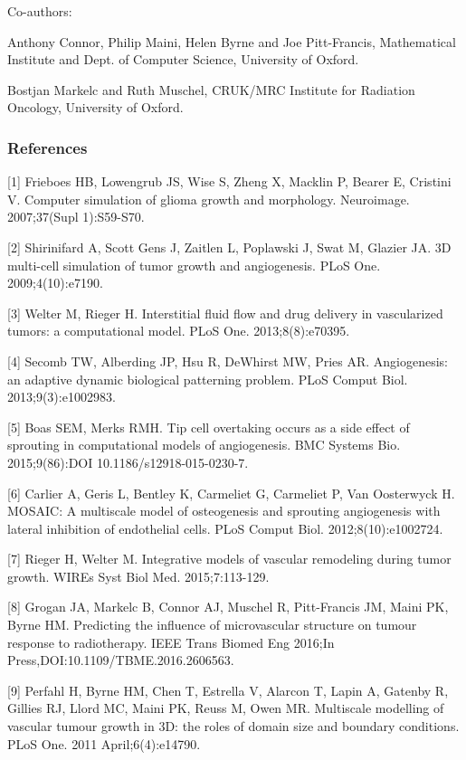 \documentclass[fullpage,11pt]{article}
\begin{document}
\noindent Co-authors: 

Anthony Connor, Philip Maini, Helen Byrne and Joe Pitt-Francis, Mathematical Institute and Dept. of Computer Science, University of Oxford.

Bostjan Markelc and Ruth Muschel, CRUK/MRC Institute for Radiation Oncology, University of Oxford.

\subsubsection*{References}

[1] Frieboes HB, Lowengrub JS, Wise S, Zheng X, Macklin P, Bearer E, Cristini V. Computer simulation of glioma growth and morphology. Neuroimage. 2007;37(Supl 1):S59-S70.

[2] Shirinifard A, Scott Gens J, Zaitlen L, Poplawski J, Swat M, Glazier JA. 3D multi-cell simulation of tumor growth and angiogenesis. PLoS One. 2009;4(10):e7190.

[3] Welter M, Rieger H. Interstitial fluid flow and drug delivery in vascularized tumors: a computational model. PLoS One. 2013;8(8):e70395.

[4] Secomb TW, Alberding JP, Hsu R, DeWhirst MW, Pries AR. Angiogenesis: an adaptive dynamic biological patterning problem. PLoS Comput Biol. 2013;9(3):e1002983.

[5] Boas SEM, Merks RMH. Tip cell overtaking occurs as a side effect of sprouting in computational models of angiogenesis. BMC Systems Bio. 2015;9(86):DOI 10.1186/s12918-015-0230-7.

[6] Carlier A, Geris L, Bentley K, Carmeliet G, Carmeliet P, Van Oosterwyck H. MOSAIC: A multiscale model of osteogenesis and sprouting angiogenesis with lateral inhibition of endothelial cells. PLoS Comput Biol. 2012;8(10):e1002724.

[7] Rieger H, Welter M. Integrative models of vascular remodeling during tumor growth. WIREs Syst Biol Med. 2015;7:113-129.

[8] Grogan JA, Markelc B, Connor AJ, Muschel R, Pitt-Francis JM, Maini PK, Byrne HM. Predicting the influence of microvascular structure on tumour response to radiotherapy. IEEE Trans Biomed Eng 2016;In
Press,DOI:10.1109/TBME.2016.2606563.

[9] Perfahl H, Byrne HM, Chen T, Estrella V, Alarcon T, Lapin A, Gatenby R, Gillies RJ, Llord MC, Maini PK, Reuss M, Owen MR. Multiscale modelling of vascular tumour growth in 3D: the roles of domain size and boundary conditions. PLoS One. 2011 April;6(4):e14790.
\end{document}

